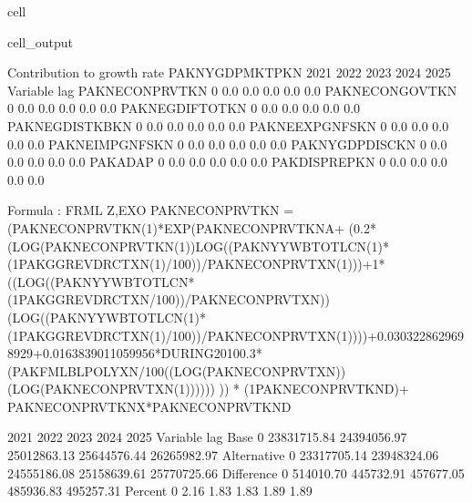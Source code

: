 \documentclass[letterpaper,10pt,english]{jupyterBook}
\begin{document}
\begin{sphinxuseclass}{cell}
\begin{sphinxVerbatimOutput}
\begin{sphinxuseclass}{cell_output}
\begin{sphinxVerbatim}[commandchars=\\\{\}]
 Contribution to growth rate PAKNYGDPMKTPKN
                          2021        2022        2023        2024        2025
Variable       lag                                                            
PAKNECONPRVTKN 0         \PYGZhy{}0.0\PYGZpc{}       \PYGZhy{}0.0\PYGZpc{}       \PYGZhy{}0.0\PYGZpc{}       \PYGZhy{}0.0\PYGZpc{}       \PYGZhy{}0.0\PYGZpc{}
PAKNECONGOVTKN 0          0.0\PYGZpc{}        0.0\PYGZpc{}        0.0\PYGZpc{}        0.0\PYGZpc{}        0.0\PYGZpc{}
PAKNEGDIFTOTKN 0          0.0\PYGZpc{}        0.0\PYGZpc{}        0.0\PYGZpc{}        0.0\PYGZpc{}        0.0\PYGZpc{}
PAKNEGDISTKBKN 0         \PYGZhy{}0.0\PYGZpc{}       \PYGZhy{}0.0\PYGZpc{}        0.0\PYGZpc{}        0.0\PYGZpc{}       \PYGZhy{}0.0\PYGZpc{}
PAKNEEXPGNFSKN 0          0.0\PYGZpc{}       \PYGZhy{}0.0\PYGZpc{}       \PYGZhy{}0.0\PYGZpc{}       \PYGZhy{}0.0\PYGZpc{}       \PYGZhy{}0.0\PYGZpc{}
PAKNEIMPGNFSKN 0          0.0\PYGZpc{}        0.0\PYGZpc{}        0.0\PYGZpc{}        0.0\PYGZpc{}        0.0\PYGZpc{}
PAKNYGDPDISCKN 0         \PYGZhy{}0.0\PYGZpc{}       \PYGZhy{}0.0\PYGZpc{}        0.0\PYGZpc{}        0.0\PYGZpc{}       \PYGZhy{}0.0\PYGZpc{}
PAKADAP        0         \PYGZhy{}0.0\PYGZpc{}       \PYGZhy{}0.0\PYGZpc{}        0.0\PYGZpc{}        0.0\PYGZpc{}       \PYGZhy{}0.0\PYGZpc{}
PAKDISPREPKN   0         \PYGZhy{}0.0\PYGZpc{}       \PYGZhy{}0.0\PYGZpc{}        0.0\PYGZpc{}        0.0\PYGZpc{}       \PYGZhy{}0.0\PYGZpc{}

Formula        : FRML \PYGZlt{}Z,EXO\PYGZgt{} PAKNECONPRVTKN = (PAKNECONPRVTKN(\PYGZhy{}1)*EXP(\PYGZhy{}PAKNECONPRVTKN\PYGZus{}A+ (\PYGZhy{}0.2*(LOG(PAKNECONPRVTKN(\PYGZhy{}1))\PYGZhy{}LOG((PAKNYYWBTOTLCN(\PYGZhy{}1)*(1\PYGZhy{}PAKGGREVDRCTXN(\PYGZhy{}1)/100))/PAKNECONPRVTXN(\PYGZhy{}1)))+1*((LOG((PAKNYYWBTOTLCN*(1\PYGZhy{}PAKGGREVDRCTXN/100))/PAKNECONPRVTXN))\PYGZhy{}(LOG((PAKNYYWBTOTLCN(\PYGZhy{}1)*(1\PYGZhy{}PAKGGREVDRCTXN(\PYGZhy{}1)/100))/PAKNECONPRVTXN(\PYGZhy{}1))))+0.0303228629698929+0.0163839011059956*DURING\PYGZus{}2010\PYGZhy{}0.3*(PAKFMLBLPOLYXN/100\PYGZhy{}((LOG(PAKNECONPRVTXN))\PYGZhy{}(LOG(PAKNECONPRVTXN(\PYGZhy{}1)))))) )) * (1\PYGZhy{}PAKNECONPRVTKN\PYGZus{}D)+ PAKNECONPRVTKN\PYGZus{}X*PAKNECONPRVTKN\PYGZus{}D  \PYGZdl{} 

                       2021        2022        2023        2024        2025
Variable    lag                                                            
Base        0   23831715.84 24394056.97 25012863.13 25644576.44 26265982.97
Alternative 0   23317705.14 23948324.06 24555186.08 25158639.61 25770725.66
Difference  0    \PYGZhy{}514010.70  \PYGZhy{}445732.91  \PYGZhy{}457677.05  \PYGZhy{}485936.83  \PYGZhy{}495257.31
Percent     0         \PYGZhy{}2.16       \PYGZhy{}1.83       \PYGZhy{}1.83       \PYGZhy{}1.89       \PYGZhy{}1.89


\end{sphinxVerbatim}
\end{sphinxuseclass}
\end{sphinxVerbatimOutput}
\end{sphinxuseclass}
\end{document}
